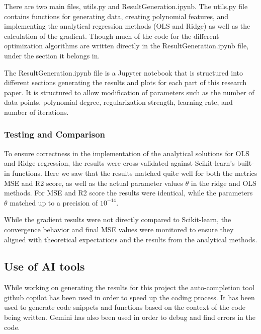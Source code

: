 \documentclass[twocolumn,aps]{revtex4}
\begin{document}
There are two main files, utils.py and ResultGeneration.ipynb.
The utils.py file contains functions for generating data, creating polynomial features, and implementing the analytical regression methods (OLS and Ridge) as well as the calculation of the gradient.
Though much of the code for the different optimization algorithms are written directly in the ResultGeneration.ipynb file, under the section it belongs in.

The ResultGeneration.ipynb file is a Jupyter notebook that is structured into different sections generating the results and plots for each part of this research paper.
It is structured to allow modification of parameters such as the number of data points, polynomial degree, regularization strength, learning rate, and number of iterations.


\subsubsection{Testing and Comparison}
To ensure correctness in the implementation of the analytical solutions for OLS and Ridge regression, the results were cross-validated against Scikit-learn's built-in functions.
Here we saw that the results matched quite well for both the metrics MSE and R2 score, as well as the actual parameter values $\theta$ in the ridge and OLS methods.
For MSE and R2 score the results were identical, while the parameters $\theta$ matched up to a precision of $10^{-14}$.

While the gradient results were not directly compared to Scikit-learn, the convergence behavior and final MSE values were monitored to ensure they aligned with theoretical expectations and the results from the analytical methods.

\subsection{Use of AI tools}
While working on generating the results for this project the auto-completion tool github copilot has been used in order to speed up the coding process.
It has been used to generate code snippets and functions based on the context of the code being written.
Gemini has also been used in order to debug and find errors in the code.
\end{document}
